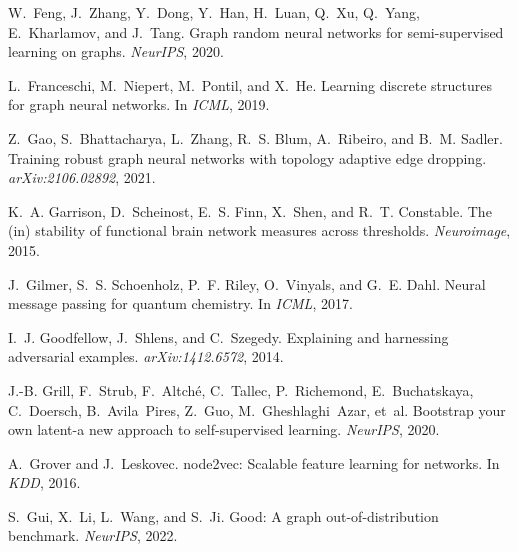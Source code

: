 \documentclass[11pt]{article}
\begin{document}
\begin{thebibliography}{10}
\begin{small}
W.~Feng, J.~Zhang, Y.~Dong, Y.~Han, H.~Luan, Q.~Xu, Q.~Yang, E.~Kharlamov, and
  J.~Tang.
\newblock Graph random neural networks for semi-supervised learning on graphs.
\newblock \emph{NeurIPS}, 2020.

L.~Franceschi, M.~Niepert, M.~Pontil, and X.~He.
\newblock Learning discrete structures for graph neural networks.
\newblock In \emph{ICML}, 2019.

Z.~Gao, S.~Bhattacharya, L.~Zhang, R.~S. Blum, A.~Ribeiro, and B.~M. Sadler.
\newblock Training robust graph neural networks with topology adaptive edge
  dropping.
\newblock \emph{arXiv:2106.02892}, 2021.

K.~A. Garrison, D.~Scheinost, E.~S. Finn, X.~Shen, and R.~T. Constable.
\newblock The (in) stability of functional brain network measures across
  thresholds.
\newblock \emph{Neuroimage}, 2015.

J.~Gilmer, S.~S. Schoenholz, P.~F. Riley, O.~Vinyals, and G.~E. Dahl.
\newblock Neural message passing for quantum chemistry.
\newblock In \emph{ICML}, 2017.

I.~J. Goodfellow, J.~Shlens, and C.~Szegedy.
\newblock Explaining and harnessing adversarial examples.
\newblock \emph{arXiv:1412.6572}, 2014.

J.-B. Grill, F.~Strub, F.~Altch{\'e}, C.~Tallec, P.~Richemond, E.~Buchatskaya,
  C.~Doersch, B.~Avila~Pires, Z.~Guo, M.~Gheshlaghi~Azar, et~al.
\newblock Bootstrap your own latent-a new approach to self-supervised learning.
\newblock \emph{NeurIPS}, 2020.

A.~Grover and J.~Leskovec.
\newblock node2vec: Scalable feature learning for networks.
\newblock In \emph{KDD}, 2016.

S.~Gui, X.~Li, L.~Wang, and S.~Ji.
\newblock Good: A graph out-of-distribution benchmark.
\newblock \emph{NeurIPS}, 2022.


\end{small}
\end{thebibliography}
\end{document}
